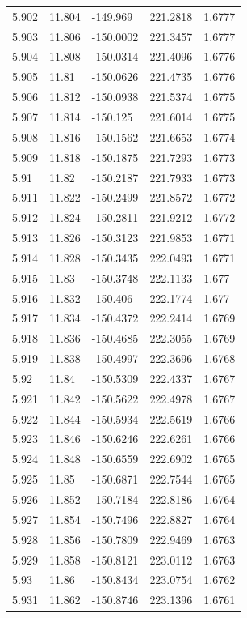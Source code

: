 \begin{tabular}{lllll}
5.902 & 11.804 & -149.969 & 221.2818 & 1.6777 \\
5.903 & 11.806 & -150.0002 & 221.3457 & 1.6777 \\
5.904 & 11.808 & -150.0314 & 221.4096 & 1.6776 \\
5.905 & 11.81 & -150.0626 & 221.4735 & 1.6776 \\
5.906 & 11.812 & -150.0938 & 221.5374 & 1.6775 \\
5.907 & 11.814 & -150.125 & 221.6014 & 1.6775 \\
5.908 & 11.816 & -150.1562 & 221.6653 & 1.6774 \\
5.909 & 11.818 & -150.1875 & 221.7293 & 1.6773 \\
5.91 & 11.82 & -150.2187 & 221.7933 & 1.6773 \\
5.911 & 11.822 & -150.2499 & 221.8572 & 1.6772 \\
5.912 & 11.824 & -150.2811 & 221.9212 & 1.6772 \\
5.913 & 11.826 & -150.3123 & 221.9853 & 1.6771 \\
5.914 & 11.828 & -150.3435 & 222.0493 & 1.6771 \\
5.915 & 11.83 & -150.3748 & 222.1133 & 1.677 \\
5.916 & 11.832 & -150.406 & 222.1774 & 1.677 \\
5.917 & 11.834 & -150.4372 & 222.2414 & 1.6769 \\
5.918 & 11.836 & -150.4685 & 222.3055 & 1.6769 \\
5.919 & 11.838 & -150.4997 & 222.3696 & 1.6768 \\
5.92 & 11.84 & -150.5309 & 222.4337 & 1.6767 \\
5.921 & 11.842 & -150.5622 & 222.4978 & 1.6767 \\
5.922 & 11.844 & -150.5934 & 222.5619 & 1.6766 \\
5.923 & 11.846 & -150.6246 & 222.6261 & 1.6766 \\
5.924 & 11.848 & -150.6559 & 222.6902 & 1.6765 \\
5.925 & 11.85 & -150.6871 & 222.7544 & 1.6765 \\
5.926 & 11.852 & -150.7184 & 222.8186 & 1.6764 \\
5.927 & 11.854 & -150.7496 & 222.8827 & 1.6764 \\
5.928 & 11.856 & -150.7809 & 222.9469 & 1.6763 \\
5.929 & 11.858 & -150.8121 & 223.0112 & 1.6763 \\
5.93 & 11.86 & -150.8434 & 223.0754 & 1.6762 \\
5.931 & 11.862 & -150.8746 & 223.1396 & 1.6761 \\

\end{tabular}
